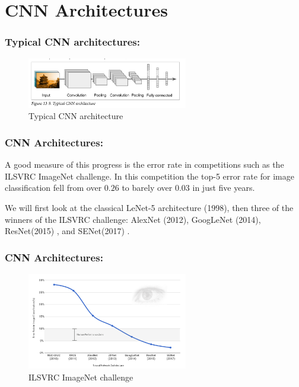 \documentclass{beamer}
\begin{document}
\section{CNN Architectures}
    \begin{frame}
    \frametitle{Typical CNN architectures: }
        \begin{figure}[H]
            \begin{center}
                \includegraphics[width=7cm]{FIGURE13-9}
            \end{center}
        \caption{Typical CNN architecture}
        \end{figure}
    \end{frame}

    \begin{frame}
    \frametitle{CNN Architectures: }
        \par A good measure of this progress is the error rate in  competitions  such  as  the ILSVRC  ImageNet  challenge.
             In  this  competition  the top-5 error rate for image
             classification fell from over $0.26$ to barely over $0.03$ in just five years.
        \par We will first look at the classical LeNet-5 architecture (1998), then three of the winners
             of  the  ILSVRC  challenge:  AlexNet  (2012),  GoogLeNet  (2014),  ResNet(2015) , and SENet(2017) .
    \end{frame}

    \begin{frame}
    \frametitle{CNN Architectures: }
        \begin{figure}[H]
            \begin{center}
                \includegraphics[width=7cm]{FIGURE13-1}
            \end{center}
        \caption{ILSVRC  ImageNet  challenge}
        \end{figure}
    \end{frame}
\end{document}
